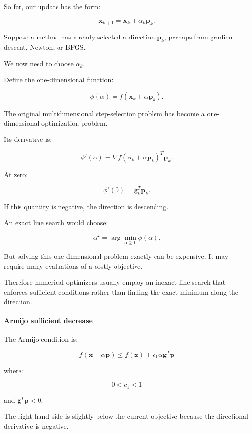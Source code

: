 \hypertarget{02-foundations-ii-ch026-line-search-optimizing-the-distance-along-a-direction}{}

So far, our update has the form:

\[
\mathbf x_{k+1}=\mathbf x_k+\alpha_k\mathbf p_k.
\]

Suppose a method has already selected a direction \(\mathbf p_k\), perhaps from gradient descent, Newton, or BFGS.

We now need to choose \(\alpha_k\).

Define the one-dimensional function:

\[
\boxed{ \phi(\alpha)=f(\mathbf x_k+\alpha\mathbf p_k) }.
\]

The original multidimensional step-selection problem has become a one-dimensional optimization problem.

Its derivative is:

\[
\phi'(\alpha)= \nabla f(\mathbf x_k+\alpha\mathbf p_k)^T\mathbf p_k.
\]

At zero:

\[
\phi'(0)=\mathbf g_k^T\mathbf p_k.
\]

If this quantity is negative, the direction is descending.

An exact line search would choose:

\[
\alpha^\star=\arg\min_{\alpha\ge0}\phi(\alpha).
\]

But solving this one-dimensional problem exactly can be expensive. It may require many evaluations of a costly objective.

Therefore numerical optimizers usually employ an inexact line search that enforces sufficient conditions rather than finding the exact minimum along the direction.

\paragraph{Armijo sufficient decrease}\label{02-foundations-ii-ch026-armijo-sufficient-decrease}

\hypertarget{02-foundations-ii-ch026-armijo-sufficient-decrease}{}

The Armijo condition is:

\[
\boxed{ f(\mathbf x+\alpha\mathbf p) \le f(\mathbf x)+c_1\alpha\mathbf g^T\mathbf p }
\]

where:

\[
0<c_1<1
\]

and \(\mathbf g^T\mathbf p<0\).

The right-hand side is slightly below the current objective because the directional derivative is negative.

